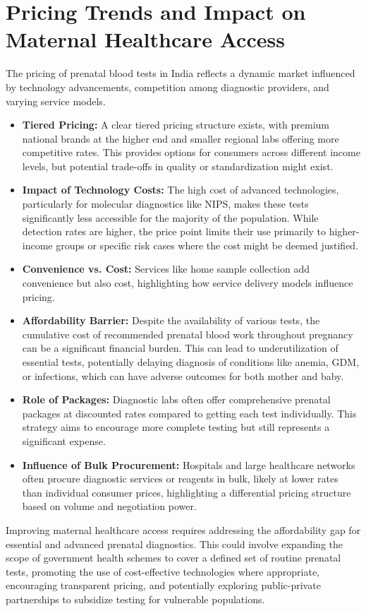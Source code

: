 \documentclass{article}
\begin{document}
\section{Pricing Trends and Impact on Maternal Healthcare Access}
The pricing of prenatal blood tests in India reflects a dynamic market influenced by technology advancements, competition among diagnostic providers, and varying service models.
\begin{itemize}
    \item \textbf{Tiered Pricing:} A clear tiered pricing structure exists, with premium national brands at the higher end and smaller regional labs offering more competitive rates. This provides options for consumers across different income levels, but potential trade-offs in quality or standardization might exist.
    \item \textbf{Impact of Technology Costs:} The high cost of advanced technologies, particularly for molecular diagnostics like NIPS, makes these tests significantly less accessible for the majority of the population. While detection rates are higher, the price point limits their use primarily to higher-income groups or specific risk cases where the cost might be deemed justified.
    \item \textbf{Convenience vs. Cost:} Services like home sample collection add convenience but also cost, highlighting how service delivery models influence pricing.
    \item \textbf{Affordability Barrier:} Despite the availability of various tests, the cumulative cost of recommended prenatal blood work throughout pregnancy can be a significant financial burden. This can lead to underutilization of essential tests, potentially delaying diagnosis of conditions like anemia, GDM, or infections, which can have adverse outcomes for both mother and baby.
    \item \textbf{Role of Packages:} Diagnostic labs often offer comprehensive prenatal packages at discounted rates compared to getting each test individually. This strategy aims to encourage more complete testing but still represents a significant expense.
    \item \textbf{Influence of Bulk Procurement:} Hospitals and large healthcare networks often procure diagnostic services or reagents in bulk, likely at lower rates than individual consumer prices, highlighting a differential pricing structure based on volume and negotiation power.
\end{itemize}
Improving maternal healthcare access requires addressing the affordability gap for essential and advanced prenatal diagnostics. This could involve expanding the scope of government health schemes to cover a defined set of routine prenatal tests, promoting the use of cost-effective technologies where appropriate, encouraging transparent pricing, and potentially exploring public-private partnerships to subsidize testing for vulnerable populations.
\end{document}

